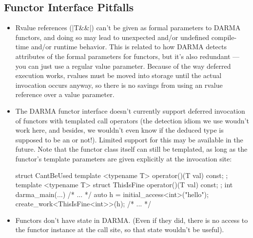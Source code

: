 \subsection{Functor Interface Pitfalls}

\begin{itemize}
  \item Rvalue references (|T&&|) can't be given as formal parameters to
    \gls{DARMA} functors, and doing so may lead to unexpected and/or undefined compile-time
    and/or runtime behavior.  This is related to how \gls{DARMA} detects attributes of
  the formal parameters for functors, but it's also redundant --- you can just
  use a regular value parameter.  
  Because of the way \gls{deferred execution} works, rvalues must be moved into
  storage until the actual invocation occurs anyway, so there is no savings
  from using an rvalue reference over a value parameter.
\item The \gls{DARMA} functor interface doesn't currently support deferred
  invocation of functors with templated call operators (the detection idiom we
  use woudn't work here, and besides, we wouldn't even know if the deduced type
  is supposed to be an  or not!).  Limited support for this may be
  available in the future.  Note that the functor class itself can still be
  templated, as long as the functor's template parameters are given explicitly
  at the invocation site:
\begin{CppCodeNumb}
struct CantBeUsed {
  template <typename T>
  operator()(T val) const;
};
template <typename T>
struct ThisIsFine {
  operator()(T val) const;
};
int darma_main(...) {
  /* ... */
  auto h = initial_access<int>("hello");
  create_work<ThisIsFine<int>>(h);
  /* ... */
}
\end{CppCodeNumb}
  \item Functors don't have state in \gls{DARMA}.  (Even if they did, there is no
  access to the functor instance at the call site, so that state wouldn't be useful).
\end{itemize}

\lstDeleteShortInline{\|}
